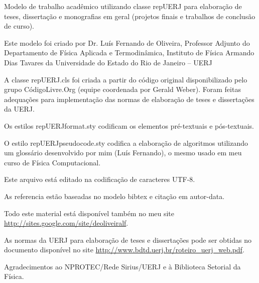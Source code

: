 
Modelo de trabalho acadêmico utilizando classe repUERJ para elaboração de teses, dissertação e monografias em geral (projetos finais e trabalhos de conclusão de curso).

Este modelo foi criado por Dr. Luís Fernando de Oliveira, Professor Adjunto do Departamento de Física Aplicada e Termodinâmica, Instituto de Física Armando Dias Tavares da Universidade do Estado do Rio de Janeiro -- UERJ

A classe repUERJ.cls foi criada a partir do código original disponibilizado pelo grupo CódigoLivre.Org (equipe coordenada por Gerald Weber). Foram feitas adequações para implementação das normas de elaboração de teses e dissertações da UERJ.

Os estilos repUERJformat.sty codificam os elementos pré-textuais e pós-textuais.

O estilo repUERJpseudocode.sty codifica a elaboração de algoritmos utilizando um glossário desenvolvido por mim (Luís Fernando), o mesmo usado em meu curso de Física Computacional.

Este arquivo está editado na codificação de caracteres UTF-8.

As referencia estão baseadas no modelo bibtex e citação em autor-data.

Todo este material está disponível também no meu site \url{http://sites.google.com/site/deoliveiralf}.

As normas da UERJ para elaboração de teses e dissertações pode ser obtidas no documento disponível no site \url{http://www.bdtd.uerj.br/roteiro_uerj_web.pdf}.

Agradecimentos ao NPROTEC/Rede Sirius/UERJ e à Biblioteca Setorial da Física.
